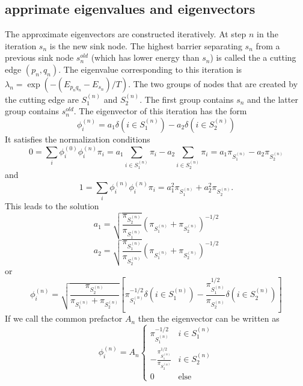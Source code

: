 \documentclass[a4paper]{article}
\newcommand{\evec}[2]{\phi^{(#2)}_{#1}}
\begin{document}
\subsection{apprimate eigenvalues and eigenvectors}

The approximate eigenvectors are constructed iteratively.  At step $n$ in the iteration
$s_n$ is the new sink node.  The highest barrier separating $s_n$ from a previous sink node $s_n^{old}$
(which has lower energy than $s_n$)
is called the a cutting edge $(p_n, q_n)$.
The eigenvalue corresponding to this iteration is $\lambda_n = \exp( -(E_{p_n q_n} - E_{s_n} )/ T )$.
The two groups of nodes that are created by the cutting edge are $S_1^{(n)}$ and 
$S_2^{(n)}$.  The first group contains $s_n$ and the latter group contains $s_n^{old}$.  
The eigenvector of this iteration has the form
\begin{equation}
\evec{i}{n} = a_1 \delta (i \in S_1^{(n)}) - a_2 \delta (i \in S_2^{(n)})
\end{equation}
It satisfies the normalization conditions
\begin{equation}
  0 = \sum_i \evec{i}{0} \evec{i}{n} \pi_i
  = a_1 \sum_{i \in S_1^{(n)}} \pi_i
  - a_2 \sum_{i \in S_2^{(n)}} \pi_i
  = a_1 \pi_{S_1^{(n)}}
  - a_2 \pi_{S_2^{(n)}}
\end{equation}
and
\begin{equation}
  1 = \sum_i \evec{i}{n} \evec{i}{n} \pi_i
  = a_1^2 \pi_{S_1^{(n)}}
  + a_2^2 \pi_{S_2^{(n)}}
  .
\end{equation}
This leads to the solution
\begin{equation}
  a_1 = \sqrt{ \frac{ \pi_{S_2^{(n)}}} { \pi_{S_1^{(n)}}} }
  \left( \pi_{S_1^{(n)}} + \pi_{S_2^{(n)}} \right)^{-1/2}
\end{equation}
\begin{equation}
  a_2 = \sqrt{ \frac{ \pi_{S_1^{(n)}}} { \pi_{S_2^{(n)}}} }
  \left( \pi_{S_1^{(n)}} + \pi_{S_2^{(n)}} \right)^{-1/2}
\end{equation}
or
\begin{equation}
\evec{i}{n} = 
  \sqrt{ \frac{ \pi_{S_2^{(n)}}}{
  \pi_{S_1^{(n)}} + \pi_{S_2^{(n)}} }}
  \left[
    \pi_{S_1^{(n)}}^{-1/2}
  \delta (i \in S_1^{(n)}) - 
  \frac{\pi_{S_1^{(n)}}^{1/2}}{\pi_{S_2^{(n)}}}  \delta (i \in S_2^{(n)})
  \right]
\end{equation}
If we call the common prefactor $A_n$ then the eigenvector can be written as
\begin{equation}
\evec{i}{n} = A_n
\begin{cases}
    \pi_{S_1^{(n)}}^{-1/2} & i \in S^{(n)}_1 \\
  - \frac{\pi_{S_1^{(n)}}^{1/2}}{\pi_{S_2^{(n)}}} & i \in S^{(n)}_2 \\
0 & \text{else}
\end{cases}
\end{equation}
\end{document}
